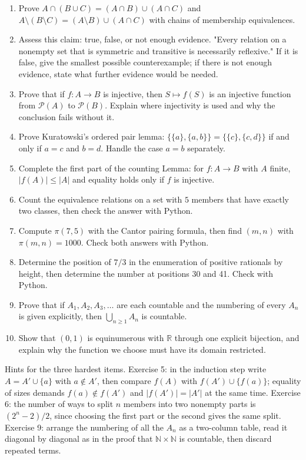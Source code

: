 \begin{latihan}
\begin{enumerate}
  \item Prove $A \cap (B \cup C) = (A \cap B) \cup (A \cap C)$ and
        $A \setminus (B \setminus C) = (A \setminus B) \cup (A \cap C)$ with chains of
        membership equivalences.
  \item Assess this claim: true, false, or not enough evidence. "Every relation on a
        nonempty set that is symmetric and transitive is necessarily reflexive." If it
        is false, give the smallest possible counterexample; if there is not enough
        evidence, state what further evidence would be needed.
  \item Prove that if $f : A \to B$ is injective, then $S \mapsto f(S)$ is an
        injective function from $\mathcal{P}(A)$ to $\mathcal{P}(B)$. Explain where
        injectivity is used and why the conclusion fails without it.
  \item Prove Kuratowski's ordered pair lemma:
        $\{\{a\},\{a,b\}\} = \{\{c\},\{c,d\}\}$ if and only if $a = c$ and
        $b = d$. Handle the case $a = b$ separately.
  \item Complete the first part of the counting Lemma: for $f : A \to B$ with $A$
        finite, $|f(A)| \le |A|$ and equality holds only if $f$ is injective.
  \item Count the equivalence relations on a set with $5$ members that have exactly
        two classes, then check the answer with Python.
  \item Compute $\pi(7,5)$ with the Cantor pairing formula, then find $(m,n)$ with
        $\pi(m,n) = 1000$. Check both answers with Python.
  \item Determine the position of $7/3$ in the enumeration of positive rationals by
        height, then determine the number at positions 30 and 41. Check with Python.
  \item Prove that if $A_1, A_2, A_3, \dots$ are each countable and the numbering of
        every $A_n$ is given explicitly, then $\bigcup_{n \ge 1} A_n$ is countable.
  \item Show that $(0,1)$ is equinumerous with $\mathbb{R}$ through one explicit
        bijection, and explain why the function we choose must have its domain
        restricted.
\end{enumerate}
\end{latihan}

Hints for the three hardest items. Exercise 5: in the induction step write
$A = A' \cup \{a\}$ with $a \notin A'$, then compare $f(A)$ with
$f(A') \cup \{f(a)\}$; equality of sizes demands $f(a) \notin f(A')$ and
$|f(A')| = |A'|$ at the same time. Exercise 6: the number of ways to split $n$ members
into two nonempty parts is $(2^{n}-2)/2$, since choosing the first part or the second
gives the same split. Exercise 9: arrange the numbering of all the $A_n$ as a two-column
table, read it diagonal by diagonal as in the proof that $\mathbb{N} \times \mathbb{N}$
is countable, then discard repeated terms.

